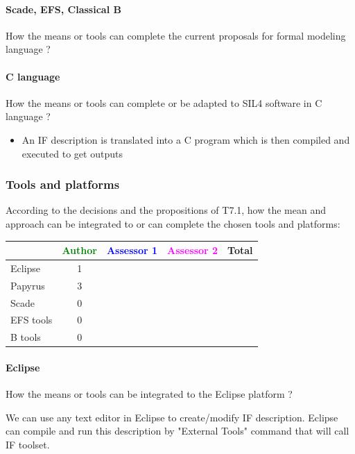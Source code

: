 \paragraph{Scade, EFS, Classical B}
How the means or tools can complete the current proposals for formal modeling language ?

\paragraph{C language}
How the means or tools can complete or be adapted to SIL4 software in C language ?

\begin{author_comment}
	\begin{itemize}
		\item An IF description is translated into a C program which is then compiled and executed to get outputs
	\end{itemize}
\end{author_comment}

\subsubsection{Tools and platforms}

According to the decisions and the propositions of T7.1, how the mean and approach can be integrated to or can complete the chosen tools and platforms:

\begin{tabular}{|l | c | c | c | c|}
\hline
& \textcolor{green}{Author} & \textcolor{blue}{Assessor 1} & \textcolor{magenta}{Assessor 2} & Total \\
\hline 
Eclipse & 1 & & &  \\
\hline
Papyrus  & 3 & & & \\
\hline
Scade & 0 & & & \\
\hline
EFS tools & 0 & & & \\
\hline
B tools & 0 & & & \\
\hline
\end{tabular}


\paragraph{Eclipse}
How the means or tools can be integrated to the Eclipse platform ?

\begin{author_comment}
		We can use any text editor in Eclipse to create/modify IF description. Eclipse can compile and run this description by "External Tools" command that will call IF toolset.
\end{author_comment}

